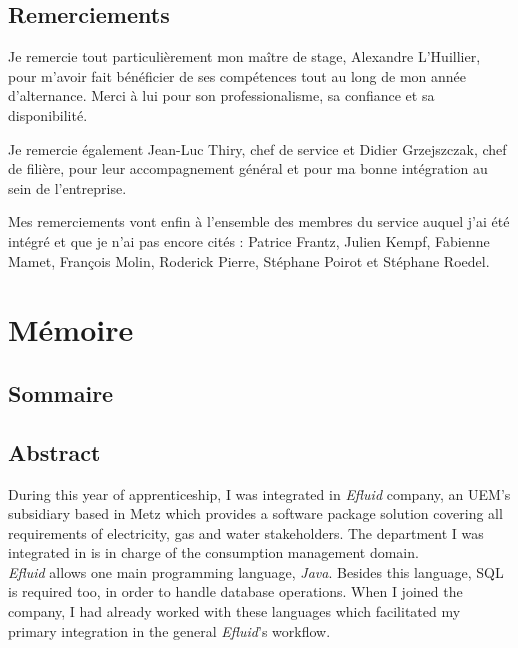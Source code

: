 \documentclass[a4paper, 12pt]{report}
\begin{document}
\chapter*{Remerciements}
\thispagestyle{empty}

Je remercie tout particulièrement mon maître de stage, Alexandre L'Huillier, pour m'avoir fait bénéficier de ses compétences tout au long de mon année d'alternance. Merci à lui pour son professionalisme, sa confiance et sa disponibilité.

Je remercie également Jean-Luc Thiry, chef de service et Didier Grzejszczak, chef de filière, pour leur accompagnement général et pour ma bonne intégration au sein de l'entreprise.

Mes remerciements vont enfin à l'ensemble des membres du service auquel j'ai été intégré et que je n'ai pas encore cités : Patrice Frantz, Julien Kempf, Fabienne Mamet, François Molin, Roderick Pierre, Stéphane Poirot et Stéphane Roedel.

\part{Mémoire}
\renewcommand{\clearpage}{}
\chapter*{Sommaire}
\renewcommand\ptctitle{}
\parttoc
\thispagestyle{empty}
\renewcommand{\clearpage}{\newpage}
\clearpage

\chapter*{Abstract}

During this year of apprenticeship, I was integrated in \textit{Efluid} company, an UEM's subsidiary based in Metz which provides a software package solution covering all requirements of electricity, gas and water stakeholders. The department I was integrated in is in charge of the consumption management domain.\\

\textit{Efluid} allows one main programming language, \textit{Java}. Besides this language, SQL is required too, in order to handle database operations. When I joined the company, I had already worked with these languages which facilitated my primary integration in the general \textit{Efluid}'s workflow.\\
\end{document}
